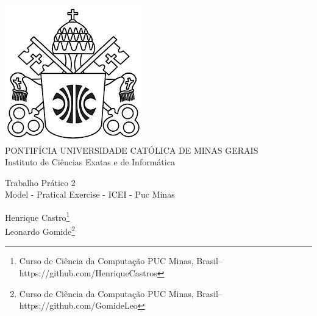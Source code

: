 \documentclass[a4paper,12pt,Times]{article}
\newcommand{\monog}{Trabalho Prático 2}
\newcommand{\monogES}{Model - Pratical Exercise - ICEI - Puc Minas}
\newcommand{\origem}{Brasil}
\newcommand{\AutorA}{Davi Dias Magalhães}
\newcommand{\emailA}{https://github.com/davidias3}
\newcommand{\cursA}{Curso de Ciência da Computação PUC Minas}
\newcommand{\AutorB}{Henrique Castro}
\newcommand{\emailB}{https://github.com/HenriqueCastros}
\newcommand{\cursB}{Curso de Ciência da Computação PUC Minas}
\newcommand{\AutorC}{Leonardo Gomide}
\newcommand{\emailC}{https://github.com/GomideLeo}
\newcommand{\cursC}{Curso de Ciência da Computação PUC Minas}
\newcommand{\keyword}[1]{\textsf{#1}}
\begin{document}
\begin{flushleft}

\begin{center}
\includegraphics[scale=0.2]{figuras/brasao.jpg} \\
PONTIFÍCIA UNIVERSIDADE CATÓLICA DE MINAS GERAIS \\
Instituto de Ciências Exatas e de Informática

 \vspace{1.0cm}

\end{center}

 \vspace{0cm} {
\singlespacing \Large{\monog {} \\ }
  \normalsize{\monogES}
 }
\end{flushleft}
\begin{flushright}
\singlespacing 
\normalsize{\AutorB \footnote{\funcaoB \cursB, \origem -- \emailB }} \\
\normalsize{\AutorC \footnote{\funcaoC \cursC, \origem -- \emailC }} \\

\end{flushright}
\thispagestyle{empty}

\begin{abstract}
\noindent
Este exercício prático contem a documentação do Trabalho Prático 2, feita em \LaTeX. Em grafos simples, pode-se encontrar sequências de vértices que vão de um ponto a outro, essa sequência, quando não repete arcos, é denominada de caminho. Tendo isso em vista, um problema é encontrar o número de caminhos disjuntos de um grafo simples qualquer, sendo caminhos disjuntos aqueles que não possuem arestas em comum. Dessa forma este trabalho propõe uma forma de lidar de com esse problema, por meio de algoritmos conhecidos dentro da área de estudo de grafos.


\\\textbf{\keyword{Palavras-chave: }}\LaTeX. Exercício Prático. Java.
\end{abstract}
\end{document}
